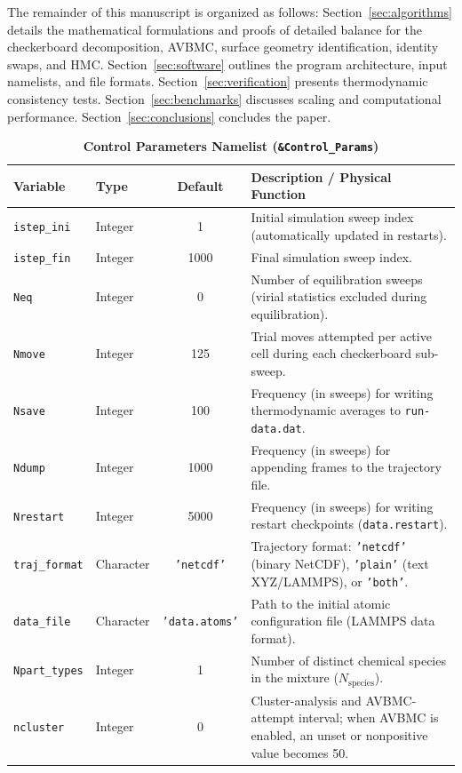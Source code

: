 \documentclass[final,5p,times,twocolumn]{elsarticle}
\begin{document}
The remainder of this manuscript is organized as follows:
Section~\ref{sec:algorithms} details the mathematical formulations and
proofs of detailed balance for the checkerboard decomposition, AVBMC,
surface geometry identification, identity swaps, and
HMC. Section~\ref{sec:software} outlines the program architecture,
input namelists, and file formats. Section~\ref{sec:verification}
presents thermodynamic
consistency tests. Section~\ref{sec:benchmarks} discusses scaling and
computational performance. Section~\ref{sec:conclusions} concludes the
paper. 
\begin{table}[tbp]
\centering
\small
\caption{\textbf{Control Parameters Namelist (\texttt{\&Control\_Params})}}
\label{tab:nml_control}
\begin{tabularx}{\textwidth}{l l c X}
\toprule
\textbf{Variable} & \textbf{Type} & \textbf{Default} & \textbf{Description / Physical Function} \\
\midrule
\texttt{istep\_ini} & Integer & 1 & Initial simulation sweep index (automatically updated in restarts). \\
\texttt{istep\_fin} & Integer & 1000 & Final simulation sweep index. \\
\texttt{Neq} & Integer & 0 & Number of equilibration sweeps (virial statistics excluded during equilibration). \\
\texttt{Nmove} & Integer & 125 & Trial moves attempted per active cell during each checkerboard sub-sweep. \\
\texttt{Nsave} & Integer & 100 & Frequency (in sweeps) for writing thermodynamic averages to \texttt{run-data.dat}. \\
\texttt{Ndump} & Integer & 1000 & Frequency (in sweeps) for appending frames to the trajectory file. \\
\texttt{Nrestart} & Integer & 5000 & Frequency (in sweeps) for writing restart checkpoints (\texttt{data.restart}). \\
\texttt{traj\_format} & Character & \texttt{'netcdf'} & Trajectory format: \texttt{'netcdf'} (binary NetCDF), \texttt{'plain'} (text XYZ/LAMMPS), or \texttt{'both'}. \\
\texttt{data\_file} & Character & \texttt{'data.atoms'} & Path to the initial atomic configuration file (LAMMPS data format). \\
\texttt{Npart\_types} & Integer & 1 & Number of distinct chemical species in the mixture ($N_{\text{species}}$). \\
\texttt{ncluster} & Integer & 0 & Cluster-analysis and AVBMC-attempt interval; when AVBMC is enabled, an unset or nonpositive value becomes 50. \\

\end{tabularx}
\end{table}
\end{document}
